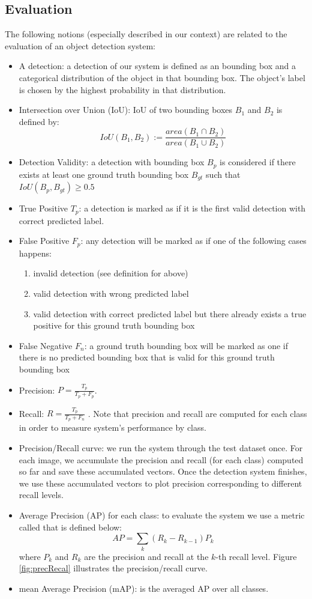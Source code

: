 \subsection{Evaluation}
The following notions (especially described in our context) are related to the evaluation of an object detection system:
\begin{itemize}
	\item A detection: a detection of our system is defined as an bounding box and a categorical distribution of the object in that bounding box. The object's label is chosen by the highest probability in that distribution.
	\item Intersection over Union (IoU): IoU of two bounding boxes $B_1$ and $B_2$ is defined by: $$IoU(B_1, B_2) := \frac{area(B_1 \cap B_2)}{area(B_1 \cup B_2)}$$
	\item Detection Validity: a detection with bounding box $B_p$ is considered  if there exists at least one ground truth bounding box $B_{gt}$ such that $IoU(B_p, B_{gt}) \geq 0.5$
	\item True Positive $T_p$: a detection is marked as  if it is the first valid detection with correct predicted label.
	\item False Positive $F_p$: any detection will be marked as  if one of the following cases happens:
	\begin{enumerate}
		\item invalid detection (see definition for  above)
		\item valid detection with wrong predicted label
		\item valid detection with correct predicted label but there already exists a true positive for this ground truth bounding box
	\end{enumerate}
	\item False Negative $F_n$: a ground truth bounding box will be marked as one  if there is no predicted bounding box that is valid for this ground truth bounding box
	\item Precision: $P = \frac{T_p}{T_p + F_p}$. 
	\item Recall: $R = \frac{T_p}{T_p + F_n}$ . Note that precision and recall are computed for each class in order to measure system's performance by class.
	\item Precision/Recall curve: we run the system through the test dataset once. For each image, we accumulate the precision and recall (for each class) computed so far and save these accumulated vectors. Once the detection system finishes, we use these accumulated vectors to plot precision corresponding to different recall levels.
	\item Average Precision (AP) for each class: to evaluate the system we use a metric called  that is defined below:
	$$ AP = \sum_k (R_k - R_{k-1})P_k $$
	where $P_k$ and $R_k$ are the precision and recall at the $k$-th recall level. Figure \ref{fig:precRecal} illustrates the precision/recall curve.
	\item mean Average Precision (mAP): is the averaged AP over all classes.
\end{itemize}
